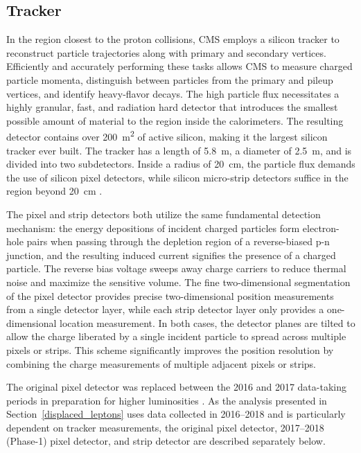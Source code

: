 \subsection{Tracker}
\label{tracker}
In the region closest to the proton collisions, CMS employs a silicon tracker to reconstruct particle trajectories along with primary and secondary vertices. Efficiently and accurately performing these tasks allows CMS to measure charged particle momenta, distinguish between particles from the primary and pileup vertices, and identify heavy-flavor decays. The high particle flux necessitates a highly granular, fast, and radiation hard detector that introduces the smallest possible amount of material to the region inside the calorimeters. The resulting detector contains over \SI{200}{\m\tothe{2}} of active silicon, making it the largest silicon tracker ever built. The tracker has a length of \SI{5.8}{\m}, a diameter of \SI{2.5}{\m}, and is divided into two subdetectors. Inside a radius of \SI{20}{\cm}, the particle flux demands the use of silicon pixel detectors, while silicon micro-strip detectors suffice in the region beyond \SI{20}{\cm} \cite{cms_experiment}. 

The pixel and strip detectors both utilize the same fundamental detection mechanism: the energy depositions of incident charged particles form electron-hole pairs when passing through the depletion region of a reverse-biased p-n junction, and the resulting induced current signifies the presence of a charged particle. The reverse bias voltage sweeps away charge carriers to reduce thermal noise and maximize the sensitive volume. The fine two-dimensional segmentation of the pixel detector provides precise two-dimensional position measurements from a single detector layer, while each strip detector layer only provides a one-dimensional location measurement. In both cases, the detector planes are tilted to allow the charge liberated by a single incident particle to spread across multiple pixels or strips. This scheme significantly improves the position resolution by combining the charge measurements of multiple adjacent pixels or strips.

The original pixel detector was replaced between the 2016 and 2017 data-taking periods in preparation for higher luminosities \cite{cms_phase1_pixels}. As the analysis presented in Section~\ref{displaced_leptons} uses data collected in 2016--2018 and is particularly dependent on tracker measurements, the original pixel detector, 2017--2018 (Phase-1) pixel detector, and strip detector are described separately below.

